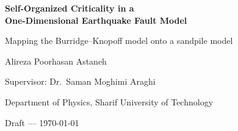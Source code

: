 \documentclass[11pt,a4paper,twoside,openright,parskip=half-,headings=optiontoheadandtoc]{scrreprt}
\theoremstyle{definition}
\begin{document}
\begin{titlepage}
\centering
\vspace*{30mm}
{\Huge\bfseries Self-Organized Criticality in a\\[2mm] One-Dimensional Earthquake Fault Model\par}
\vspace{8mm}
{\Large Mapping the Burridge--Knopoff model onto a sandpile model\par}
\vspace{20mm}
{\large Alireza Poorhasan Astaneh\par}
\vspace{4mm}
{\normalsize Supervisor: Dr.\ Saman Moghimi Araghi\par}
{\normalsize Department of Physics, Sharif University of Technology\par}
\vfill
{\small Draft --- \today\par}
\end{titlepage}

\end{document}
